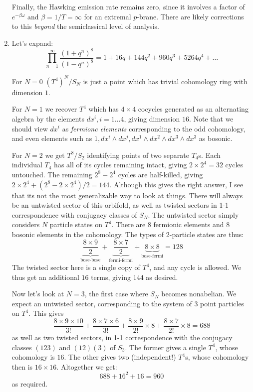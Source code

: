 \documentclass[11pt, class=article, crop=false]{standalone}
\begin{document}
\begin{enumerate}
	Finally, the Hawking emission rate remains zero, since it involves a factor of $e^{-\beta \omega}$ and $\beta = 1/T = \infty$ for an extremal $p$-brane. There are likely corrections to this \emph{beyond} the semiclassical level of analysis.
	
	\item Let's expand:
	\[
		\prod_{n=1}^\infty \frac{(1+q^n)^8}{(1-q^n)^8} = 1 + 16 q + 144 q^2 + 960 q^3 + 5264 q^4 + \dots
	\]
	
	For $N=0$ $(T^4)^N/S_N$ is just a point which has trivial cohomology ring with dimension $1$. 
	
	For $N=1$ we recover $T^4$ which has $4 \times 4$ cocycles generated as an alternating algebra by the elements $dx^i, i = 1 \dots 4$, giving dimension $16$. Note that we should view $dx^i$ as \emph{fermionc elements} corresponding to the odd cohomology, and even elements such as $1, dx^i \wedge dx^j, dx^1 \wedge dx^2 \wedge dx^3 \wedge dx^3$ as bosonic.
	
	For $N=2$ we get $T^{8}/S_2$ identifying points of two separate $T_4$s. Each individual $T_4$ has all of its cycles remaining intact, giving $2 \times 2^4 = 32$ cycles untouched. The remaining $2^8 - 2^4$ cycles are half-killed, giving $2 \times 2^4 + (2^8 - 2 \times 2^4)/2 = 144$. Although this gives the right answer, I see that its not the most generalizable way to look at things. There will always be an untwisted sector of this orbifold, as well as twisted sectors in 1-1 correspondence with conjugacy classes of $S_N$. The untwisted sector simply considers $N$ particle states on $T^4$. There are $8$ fermionic elements and $8$ bosonic elements in the cohomology. The types of 2-particle states are thus:
	\[
		\underbrace{\frac{8 \times 9}{2}}_{\text{bose-bose}}  + \underbrace{\frac{8 \times 7}{2}}_{\text{fermi-fermi}} + 	\underbrace{8 \times 8}_{\text{bose-fermi}} = 128
	\]
	The twisted sector here is a single copy of $T^4$, and any cycle is allowed. We thus get an additional $16$ terms, giving $144$ as desired. 
	
	Now let's look at $N=3$, the first case where $S_N$ becomes nonabelian. We expect an untwisted sector, corresponding to the system of $3$ point particles on $T^4$. This gives 
	\[
		\frac{8 \times  9 \times 10}{3!} + \frac{8 \times  7 \times 6}{3!} + \frac{8 \times 9}{2!} \times 8 + \frac{8 \times 7}{2!} \times 8 = 688
	\]
	 as well as two twisted sectors, in 1-1 correspondence with the conjugacy classes $(123)$ and $(12)(3)$ of $S_3$. The former gives a single $T^4$, whose cohomology is $16$. The other gives two (independent!) $T^4$s, whose cohomology then is $16 \times 16$. Altogether we get:
	 \[
	 	688 + 16^2 + 16 = 960
	 \]
	 as required.
	 

\end{enumerate}
\end{document}
